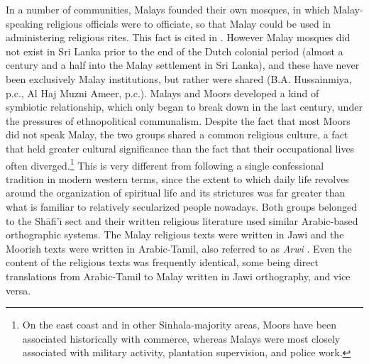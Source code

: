 In a number of communities, Malays founded their own mosques, in which Malay-speaking religious officials were to officiate, so that Malay could be used in administering religious rites. This fact is cited in \citet{Nordhoff2009}. However Malay mosques did not exist in Sri Lanka prior to the end of the Dutch colonial period (almost a century and a half into the Malay settlement in Sri Lanka), and these have never been exclusively Malay institutions, but rather were shared (B.A. Hussainmiya, p.c., Al Haj Muzni Ameer, p.c.). Malays and Moors developed a kind of symbiotic relationship, which only began to break down in the last century, under the pressures of ethnopolitical communalism. Despite the fact that most Moors did not speak Malay, the two groups shared a common religious culture, a fact that held greater cultural significance than the fact that their occupational lives often diverged.\footnote{On
  the east coast and in other Sinhala-majority areas, Moors have been associated historically with commerce, whereas Malays were most closely associated with military activity, plantation supervision, and police work.
} 
This is very different from following a single confessional tradition in modern western terms, since the extent to which daily life revolves around the organization of spiritual life and its strictures was far greater than what is familiar to relatively secularized people nowadays. Both groups belonged to the Sh\=afi'{\=\i} sect and their written religious literature used similar Arabic-based orthographic systems. The Malay religious texts were written in Jawi and the Moorish texts were written in Arabic-Tamil, also referred to as \textit{Arwi} \citep{Shuayb1993}.  Even the content of the religious texts was frequently identical, some being direct translations from Arabic-Tamil to Malay written in Jawi orthography, and vice versa.

